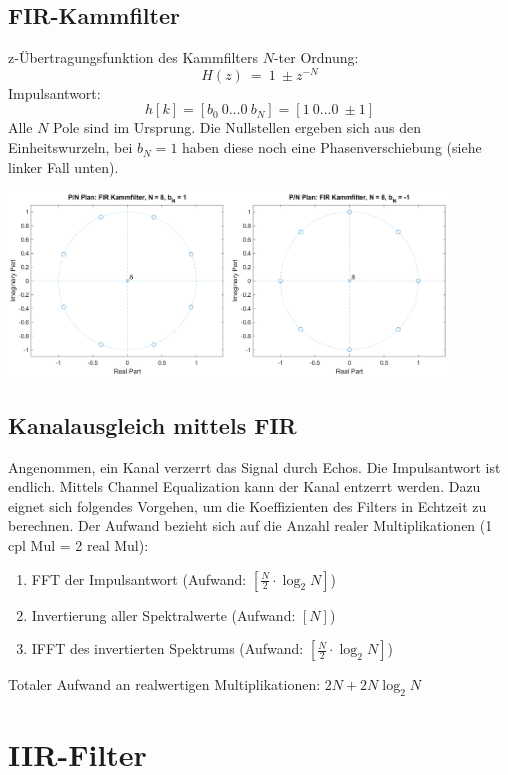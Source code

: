 \subsection{FIR-Kammfilter}
z-Übertragungsfunktion des Kammfilters $N$-ter Ordnung:
\[ H(z)\ =\ 1\ \pm z^{-N} \]
Impulsantwort:
\[ h[k]= [b_0 \ 0 \dots 0 \ b_N] =  [1 \ 0 \dots 0 \ \pm1] \]
Alle $N$ Pole sind im Ursprung. Die Nullstellen ergeben sich aus den Einheitswurzeln, 
bei $b_N=1$ haben diese noch eine Phasenverschiebung (siehe linker Fall unten).
\begin{center}
	\includegraphics[width=0.875\textwidth]{../fig/fir_comb}
\end{center}\vspace{-4mm}
\subsection{Kanalausgleich mittels FIR}
Angenommen, ein Kanal verzerrt das Signal durch Echos. Die Impulsantwort ist endlich. 
Mittels Channel Equalization kann der Kanal entzerrt werden. Dazu eignet sich folgendes
Vorgehen, um die Koeffizienten des Filters in Echtzeit zu berechnen. Der Aufwand bezieht 
sich auf die Anzahl realer Multiplikationen (1 cpl Mul = 2 real Mul): 
\begin{enumerate}[noitemsep,topsep=3pt]
	\item FFT der Impulsantwort (Aufwand: $\left[\frac{N}{2}\cdot\log_2N\right]$)
	\item Invertierung aller Spektralwerte (Aufwand: $\left[N\right]$)
	\item IFFT des invertierten Spektrums (Aufwand: $\left[\frac{N}{2}\cdot\log_2N\right]$)
\end{enumerate}
Totaler Aufwand an realwertigen Multiplikationen: $2N + 2N\log_2N$
\newpage

\section{IIR-Filter}
